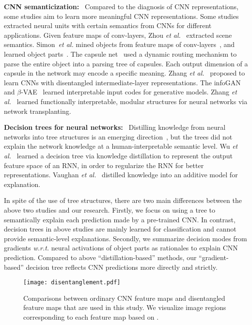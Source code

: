 \documentclass[10pt,twocolumn,letterpaper]{article}
\begin{document}
\textbf{CNN semanticization:}{\verb| |} Compared to the diagnosis of CNN representations, some studies aim to learn more meaningful CNN representations. Some studies extracted neural units with certain semantics from CNNs for different applications. Given feature maps of conv-layers, Zhou \emph{et al.}~\cite{CNNSemanticDeep} extracted scene semantics. Simon~\emph{et al.} mined objects from feature maps of conv-layers~\cite{ObjectDiscoveryCNN_2}, and learned object parts~\cite{CNNSemanticPart}. The capsule net~\cite{capsule} used a dynamic routing mechanism to parse the entire object into a parsing tree of capsules. Each output dimension of a capsule in the network may encode a specific meaning. Zhang \emph{et al.}~\cite{interpretableCNN} proposed to learn CNNs with disentangled intermediate-layer representations. The infoGAN~\cite{infoGAN} and $\beta$-VAE~\cite{betaVAE} learned interpretable input codes for generative models. Zhang \emph{et al.}~\cite{transplant} learned functionally interpretable, modular structures for neural networks via network transplanting.

\textbf{Decision trees for neural networks:}{\verb| |} Distilling knowledge from neural networks into tree structures is an emerging direction~\cite{distillDecisionTree,TreeDistill,TreeDistill2}, but the trees did not explain the network knowledge at a human-interpretable semantic level. Wu \emph{et al.}~\cite{RNNTree} learned a decision tree via knowledge distillation to represent the output feature space of an RNN, in order to regularize the RNN for better representations. Vaughan \emph{et al.}~\cite{additiveExplainer} distilled knowledge into an additive model for explanation.

In spite of the use of tree structures, there are two main differences between the above two studies and our research. Firstly, we focus on using a tree to semantically explain each prediction made by a pre-trained CNN. In contrast, decision trees in above studies are mainly learned for classification and cannot provide semantic-level explanations. Secondly, we summarize decision modes from gradients \emph{w.r.t.} neural activations of object parts as rationales to explain CNN prediction. Compared to above ``distillation-based'' methods, our ``gradient-based'' decision tree reflects CNN predictions more directly and strictly.

\begin{figure}[t]
\centering
\texttt{[image: disentanglement.pdf]}
\caption{Comparisons between ordinary CNN feature maps and disentangled feature maps that are used in this study. We visualize image regions corresponding to each feature map based on \cite{CNNSemanticDeep}.}
\label{fig:disentanglement}
\end{figure}
\end{document}
